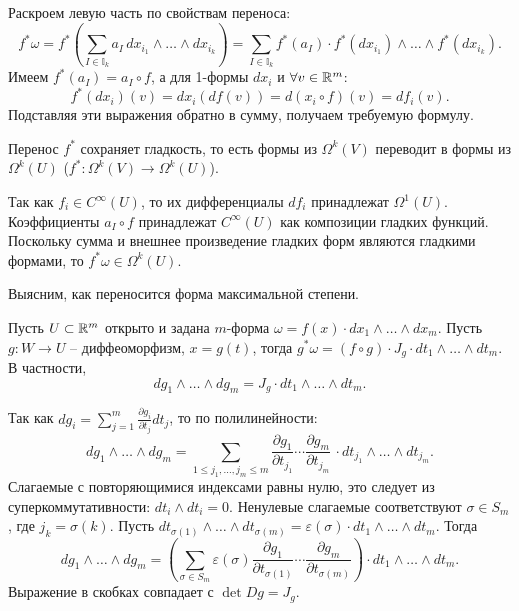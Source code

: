 \begin{myproof}
	Раскроем левую часть по свойствам переноса:
	\[ f^* \omega = f^* \left( \sum_{I \in \mathbb{I}_k} a_I \, dx_{i_1} \wedge \dotsc \wedge dx_{i_k} \right) = \sum_{I \in \mathbb{I}_k} f^*(a_I) \cdot f^*(dx_{i_1}) \wedge \dotsc \wedge f^*(dx_{i_k}). \]
	Имеем $f^*(a_I) = a_I \circ f$, а для 1-формы $dx_i$ и $\forall v \in \mathbb{R}^m$:
	\[ f^*(dx_i)(v) = dx_i (df (v)) = d(x_i \circ f)(v) = df_i (v). \]
	Подставляя эти выражения обратно в сумму, получаем требуемую формулу.
\end{myproof}

\begin{corollary}
	Перенос $f^*$ сохраняет гладкость, то есть формы из $\Omega^k(V)$ переводит в формы из $\Omega^k(U)$ ($f^* : \Omega^k(V) \to \Omega^k(U)$).
\end{corollary}

\begin{myproof}
	Так как $f_i \in C^\infty(U)$, то их дифференциалы $df_i$ принадлежат $\Omega^1(U)$.
	Коэффициенты $a_I \circ f$ принадлежат $C^\infty(U)$ как композиции гладких функций.
	Поскольку сумма и внешнее произведение гладких форм являются гладкими формами, то $f^* \omega \in \Omega^k(U)$.
\end{myproof}

\vspace{5pt}
Выясним, как переносится форма максимальной степени.

\begin{example}
	Пусть $U \subset \mathbb{R}^m$ открыто и задана $m$-форма $\omega = f(x) \cdot dx_1 \wedge \dotsc \wedge dx_m$. 
	Пусть $g : W \to U$ -- диффеоморфизм, $x = g(t)$, тогда $g^* \omega = (f \circ g) \cdot J_g \cdot dt_1 \wedge \dotsc \wedge dt_m$. В частности,
	\[ dg_1 \wedge \dotsc \wedge dg_m = J_g \cdot dt_1 \wedge \dotsc \wedge dt_m. \]
\end{example}

\begin{myproof}
	Так как $dg_i = \sum \limits_{j=1}^m \frac{\partial g_i}{\partial t_j} dt_j$, то по полилинейности:
	\[ dg_1 \wedge \dotsc \wedge dg_m = \sum_{1 \leq j_1, \dotsc, j_m \leq m} \frac{\partial g_1}{\partial t_{j_1}} \dotsm \frac{\partial g_m}{\partial t_{j_m}} \, \cdot dt_{j_1} \wedge \dotsc \wedge dt_{j_m}. \]
	Слагаемые с повторяющимися индексами равны нулю, это следует из суперкоммутативности: $dt_i \wedge dt_i = 0$. Ненулевые слагаемые соответствуют $\sigma \in S_m$, где $j_k = \sigma(k)$. Пусть $dt_{\sigma(1)} \wedge \dotsc \wedge dt_{\sigma(m)} = \varepsilon(\sigma) \cdot dt_1 \wedge \dotsc \wedge dt_m$. Тогда 
	\[ dg_1 \wedge \dotsc \wedge dg_m = \left( \sum_{\sigma \in S_m} \varepsilon(\sigma) \frac{\partial g_1}{\partial t_{\sigma(1)}} \dotsm \frac{\partial g_m}{\partial t_{\sigma(m)}} \right) \cdot dt_1 \wedge \dotsc \wedge dt_m. \]
	Выражение в скобках совпадает с $\det Dg = J_g$.
\end{myproof}

